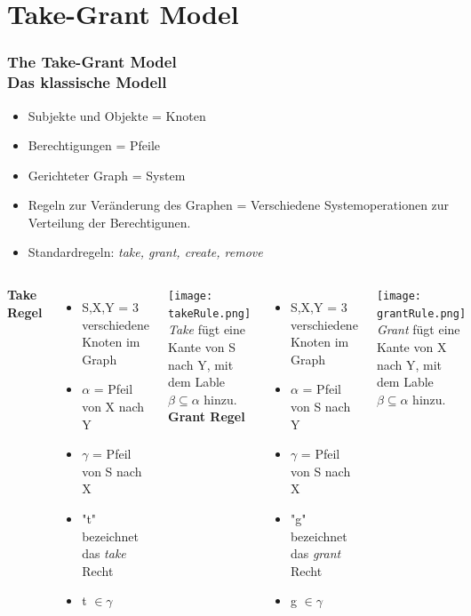 \documentclass{beamer}
\begin{document}
\section{Take-Grant Model}
\begin{frame}
\frametitle{The Take-Grant Model\\{\small Das klassische Modell}}
\begin{itemize}
\item Subjekte und Objekte = Knoten
\item Berechtigungen = Pfeile
\item Gerichteter Graph = System
\item Regeln zur Veränderung des Graphen = Verschiedene Systemoperationen zur Verteilung der Berechtigunen. 
\item Standardregeln: \textit{take, grant, create, remove}
\end{itemize}
\end{frame}
\begin{frame}
\begin{columns}[t]
\textbf{Take Regel}
\begin{itemize}
\item S,X,Y = 3 verschiedene Knoten im Graph 
\item $\alpha$ = Pfeil von X nach Y 
\item $\gamma$ = Pfeil von S nach X
\item "t" bezeichnet das \textit{take} Recht
\item t $\in \gamma$
\end{itemize}
\texttt{[image: takeRule.png]} \\
\textit{Take} fügt eine Kante von S nach Y, mit dem Lable $\beta \subseteq \alpha$ hinzu.
\textbf{Grant Regel}
\begin{itemize}
\item S,X,Y = 3 verschiedene Knoten im Graph 
\item $\alpha$ = Pfeil von S nach Y 
\item $\gamma$ = Pfeil von S nach X
\item "g" bezeichnet das \textit{grant} Recht
\item g $\in \gamma$
\end{itemize}
\texttt{[image: grantRule.png]} \\
\textit{Grant} fügt eine Kante von X nach Y, mit dem Lable $\beta \subseteq \alpha$ hinzu.
\end{columns}
\end{frame}
\end{document}
